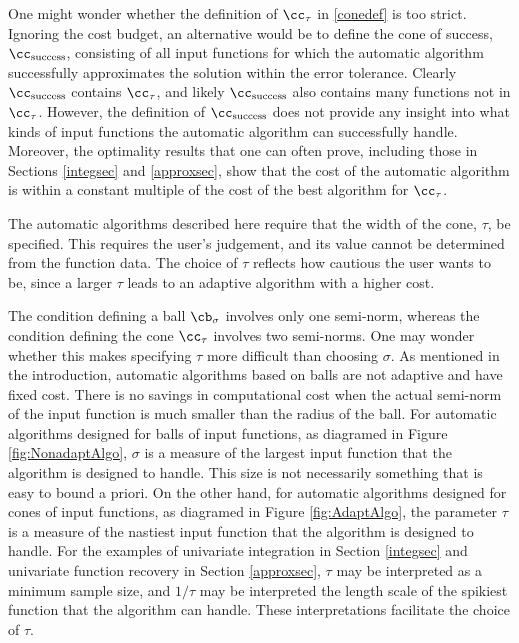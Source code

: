 \documentclass[]{elsarticle}
\theoremstyle{definition}
\theoremstyle{remark}
\begin{document}
One might wonder whether the definition of $\cc_{\tau}$ in \eqref{conedef} is too strict.  Ignoring the cost budget, an alternative would be to define the cone of success, $\cc_{\text{success}}$, consisting of all input functions for which the automatic algorithm successfully approximates the solution within the error tolerance.  Clearly $\cc_{\text{success}}$ contains $\cc_{\tau}$, and likely $\cc_{\text{success}}$ also contains many functions not in $\cc_{\tau}$.  However, the definition of $\cc_{\text{success}}$ does not provide any insight into what kinds of input functions the automatic algorithm can successfully handle.  Moreover, the optimality results that one can often prove, including those in Sections \ref{integsec} and \ref{approxsec}, show that the cost of the automatic algorithm is within a constant multiple of the cost of the best algorithm for $\cc_{\tau}$.

The automatic algorithms described here require that the width of the cone, $\tau$, be specified.  This requires the user's judgement, and its value cannot be determined from the function data.  The choice of $\tau$ reflects how cautious the user wants to be, since a larger $\tau$ leads to an adaptive algorithm with a higher cost. 

The condition defining a ball $\cb_{\sigma}$ involves only one semi-norm, whereas the condition defining the cone $\cc_{\tau}$ involves two semi-norms.  One may wonder whether this makes specifying $\tau$ more difficult than choosing $\sigma$.  As mentioned in the introduction, automatic algorithms based on balls are not adaptive and have fixed cost. There is no savings in computational cost when the actual semi-norm of the input function is much smaller than the radius of the ball. For automatic algorithms designed for balls of input functions, as diagramed in Figure \ref{fig:NonadaptAlgo},  $\sigma$ is a measure of the largest input function that the algorithm is designed to handle.  This size is not necessarily something that is easy to bound a priori.  On the other hand, for automatic algorithms designed for cones of input functions, as diagramed in Figure \ref{fig:AdaptAlgo}, the parameter $\tau$ is a measure of the nastiest input function that the algorithm is designed to handle.  For the examples of univariate integration in Section \ref{integsec} and univariate function recovery in Section \ref{approxsec}, $\tau$ may be interpreted as a minimum sample size, and $1/\tau$ may be interpreted the length scale of the spikiest function that the algorithm can handle. These interpretations facilitate the choice of $\tau$. 
\end{document}
